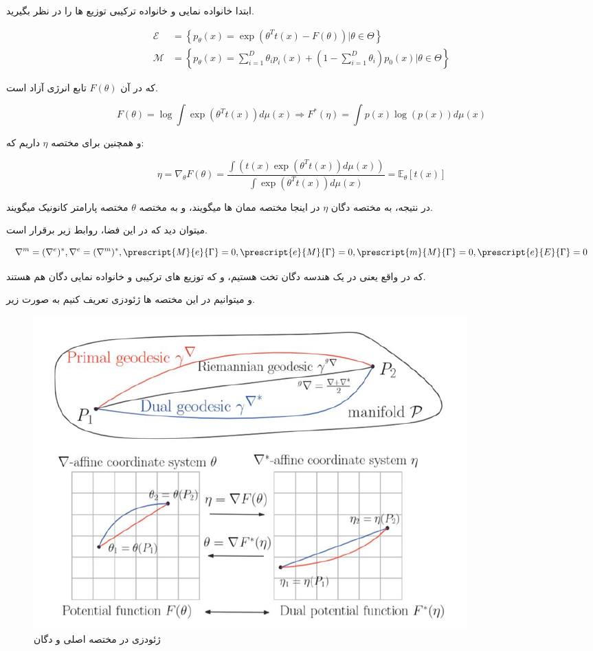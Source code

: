 ابتدا خانواده نمایی و خانواده ترکیبی توزیع ها را در نظر بگیرید.

\begin{align*}
	\mathcal{E} & =\left\{p_\theta(x)=\exp(\theta^Tt(x)-F(\theta))|\theta\in\Theta\right\}                                  \\
	\mathcal{M} & =\left\{p_\theta(x)=\sum_{i=1}^{D}\theta_ip_i(x)+(1-\sum_{i=1}^{D}\theta_i)p_0(x)|\theta\in\Theta\right\}
\end{align*}

که در آن $F(\theta)$ تابع انرژی آزاد است.

$$
	F(\theta)=\log\int\exp(\theta^Tt(x))d\mu(x) \Rightarrow F^*(\eta)=\int p(x)\log(p(x))d\mu(x)
$$

و همچنین برای مختصه $\eta$ داریم که:

$$
	\eta=\nabla_\theta F(\theta)=\frac{\int(t(x)\exp(\theta^Tt(x))d\mu(x))}{\int\exp(\theta^Tt(x))d\mu(x)}=\mathbb{E}_\theta[t(x)]
$$

در نتیجه، به مختصه دگان $\eta$ در اینجا مختصه ممان ها میگویند، و به مختصه $\theta$ مختصه پارامتر کانونیک میگویند.

میتوان دید که در این فضا، روابط زیر برقرار است.

$$\nabla^m=(\nabla^e)^*, \nabla^e=(\nabla^m)^*, \prescript{M}{e}{\Gamma}=0, \prescript{e}{M}{\Gamma}=0, \prescript{m}{M}{\Gamma}=0, \prescript{e}{E}{\Gamma}=0$$

که در واقع یعنی در یک هندسه دگان تخت هستیم، و که توزیع های ترکیبی و خانواده نمایی دگان هم هستند.

و میتوانیم در این مختصه ها ژئودزی تعریف کنیم به صورت زیر.

\begin{figure}[h]
    \centering
    \includegraphics*[width=0.7\linewidth]{Pictures/Q5/geodesic.png}
    \caption{ژئودزی در مختصه اصلی و دگان}
\end{figure}

